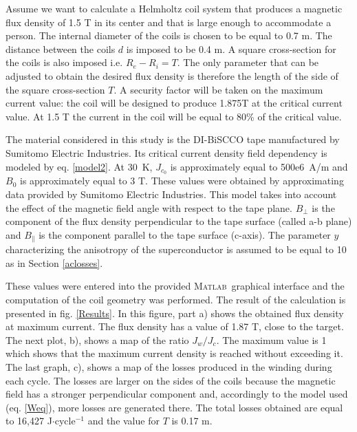 \documentclass{ws-jmrr}
\newcommand{\MATLAB}{{\textsc{Matlab}}}
\begin{document}
\begin{multicols}{2}
Assume we want to calculate a Helmholtz coil system that produces a magnetic flux density of 1.5 T in its center and that is large enough to accommodate a person. 
 The internal diameter of the coils is chosen to be equal to 0.7 m. The distance between the coils $d$ is imposed to be 0.4 m. 
  A square cross-section for the coils is also imposed i.e. $R_e-R_i=T$. 
  The only parameter that can be adjusted to obtain the desired flux density is therefore the length of the side of the square cross-section $T$. 
  A security factor will be taken on the maximum current value: the coil will be designed to produce 1.875T at the critical current value. 
   At 1.5 T the current in the coil will be equal to 80\% of the critical value.\par
The material considered in this study is the DI-BiSCCO tape manufactured by Sumitomo Electric Industries. 
Its critical current density field dependency is modeled by eq. \ref{model2}. 
At 30~K, $J_{c_0}$ is approximately equal to 500e6~A/m and $B_0$ is approximately equal to 3 T. 
 These values were obtained by approximating data provided by Sumitomo Electric Industries. 
  This model takes into account the effect of the magnetic field angle with respect to the tape plane. 
   $B_{\perp}$ is the component of the flux density perpendicular to the tape surface (called a-b plane) and $B_{\parallel}$ is the component parallel to the tape surface (c-axis). 
    The parameter $y$ characterizing the anisotropy of the superconductor is assumed to be equal to 10 as in Section \ref{aclosses}.\par
These values were entered into the provided \MATLAB ~graphical interface and the computation of the coil geometry was performed.
 The result of the calculation is presented in fig. \ref{Results}. 
 In this figure, part a) shows the obtained flux density at maximum current. 
  The flux density has a value of 1.87 T, close to the target. 
  The next plot, b), shows a map of the ratio $J_w/J_c$. The maximum value is 1 which shows that the maximum current density is reached without exceeding it. 
  The last graph, c), shows a map of the losses produced in the winding during each cycle. 
   The losses are larger on the sides of the coils because the magnetic field has a stronger perpendicular component and, accordingly to the model used (eq. \ref{Weq}), more losses are generated there. The total losses obtained are equal to 16,427 J$\cdot$cycle$^{-1}$ and the value for $T$ is 0.17 m.

\end{multicols}
\end{document}
